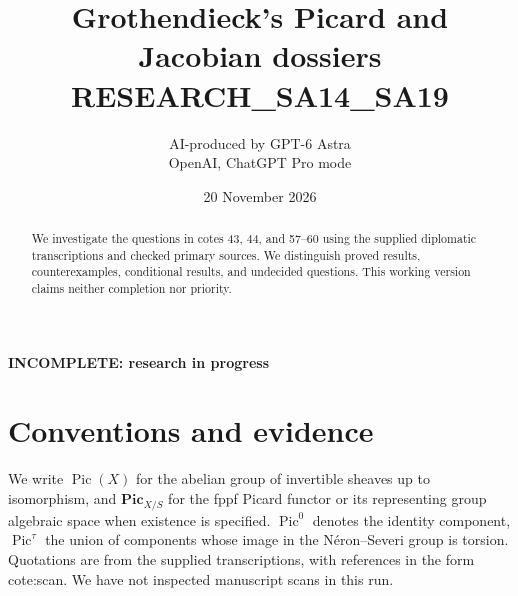 \documentclass[11pt,a4paper]{article}
\title{Grothendieck's Picard and Jacobian dossiers\\\large RESEARCH\_SA14\_SA19}
\author{AI-produced by GPT-6 Astra\\OpenAI, ChatGPT Pro mode}
\date{20 November 2026}
\theoremstyle{definition}
\DeclareMathOperator{\Pic}{Pic}
\begin{document}
\maketitle
\begin{center}\textbf{INCOMPLETE: research in progress}\end{center}
\begin{abstract}
We investigate the questions in cotes 43, 44, and 57--60 using the supplied diplomatic transcriptions and checked primary sources. We distinguish proved results, counterexamples, conditional results, and undecided questions. This working version claims neither completion nor priority.
\end{abstract}
\tableofcontents
\section*{Conventions and evidence}
We write $\Pic(X)$ for the abelian group of invertible sheaves up to isomorphism, and $\mathbf{Pic}_{X/S}$ for the fppf Picard functor or its representing group algebraic space when existence is specified. $\Pic^0$ denotes the identity component, $\Pic^\tau$ the union of components whose image in the N\'eron--Severi group is torsion. Quotations are from the supplied transcriptions, with references in the form cote:scan. We have not inspected manuscript scans in this run.













\end{document}
